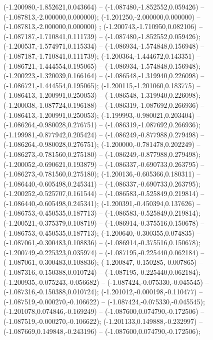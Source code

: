  (-1.200980,-1.852621,0.043664) -- (-1.087480,-1.852552,0.059426) -- (-1.087813,-2.000000,0.000000);
 (-1.201250,-2.000000,0.000000) -- (-1.087813,-2.000000,0.000000) ;
 (-1.200743,-1.710950,0.082106) -- (-1.087187,-1.710841,0.111739) -- (-1.087480,-1.852552,0.059426);
 (-1.200537,-1.574971,0.115334) -- (-1.086934,-1.574848,0.156948) -- (-1.087187,-1.710841,0.111739);
 (-1.200364,-1.444672,0.143351) -- (-1.086721,-1.444554,0.195065) -- (-1.086934,-1.574848,0.156948);
 (-1.200223,-1.320039,0.166164) -- (-1.086548,-1.319940,0.226098) -- (-1.086721,-1.444554,0.195065);
 (-1.200115,-1.201060,0.183775) -- (-1.086413,-1.200991,0.250053) -- (-1.086548,-1.319940,0.226098);
 (-1.200038,-1.087724,0.196188) -- (-1.086319,-1.087692,0.266936) -- (-1.086413,-1.200991,0.250053);
 (-1.199993,-0.980021,0.203404) -- (-1.086264,-0.980028,0.276751) -- (-1.086319,-1.087692,0.266936);
 (-1.199981,-0.877942,0.205424) -- (-1.086249,-0.877988,0.279498) -- (-1.086264,-0.980028,0.276751);
 (-1.200000,-0.781478,0.202249) -- (-1.086273,-0.781560,0.275180) -- (-1.086249,-0.877988,0.279498);
 (-1.200052,-0.690621,0.193879) -- (-1.086337,-0.690733,0.263795) -- (-1.086273,-0.781560,0.275180);
 (-1.200136,-0.605366,0.180311) -- (-1.086440,-0.605498,0.245341) -- (-1.086337,-0.690733,0.263795);
 (-1.200252,-0.525707,0.161544) -- (-1.086583,-0.525849,0.219814) -- (-1.086440,-0.605498,0.245341);
 (-1.200391,-0.450394,0.137626) -- (-1.086753,-0.450535,0.187713) -- (-1.086583,-0.525849,0.219814);
 (-1.200521,-0.375379,0.108719) -- (-1.086914,-0.375516,0.150678) -- (-1.086753,-0.450535,0.187713);
 (-1.200640,-0.300355,0.074835) -- (-1.087061,-0.300483,0.108836) -- (-1.086914,-0.375516,0.150678);
 (-1.200749,-0.225323,0.035974) -- (-1.087195,-0.225440,0.062184) -- (-1.087061,-0.300483,0.108836);
 (-1.200847,-0.150285,-0.007865) -- (-1.087316,-0.150388,0.010724) -- (-1.087195,-0.225440,0.062184);
 (-1.200935,-0.075243,-0.056682) -- (-1.087424,-0.075330,-0.045545) -- (-1.087316,-0.150388,0.010724);
 (-1.201012,-0.000198,-0.110477) -- (-1.087519,-0.000270,-0.106622) -- (-1.087424,-0.075330,-0.045545);
 (-1.201078,0.074846,-0.169249) -- (-1.087600,0.074790,-0.172506) -- (-1.087519,-0.000270,-0.106622);
 (-1.201133,0.149888,-0.232997) -- (-1.087669,0.149848,-0.243196) -- (-1.087600,0.074790,-0.172506);
